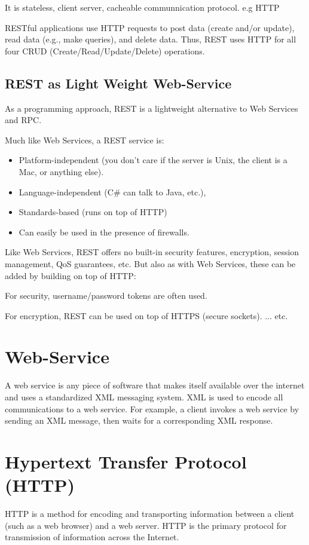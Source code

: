 \documentclass[letterpaper,10pt,english]{sphinxmanual}
\begin{document}
It is stateless, client server, cacheable communnication protocol. e.g HTTP

RESTful applications use HTTP requests to post data (create and/or update), read data (e.g., make queries), and delete data. Thus, REST uses HTTP for all four CRUD (Create/Read/Update/Delete) operations.


\subsection{REST as Light Weight Web-Service}
\label{week-10:rest-as-light-weight-web-service}
As a programming approach, REST is a lightweight alternative to Web Services and RPC.

Much like Web Services, a REST service is:
\begin{itemize}
\item {} 
Platform-independent (you don't care if the server is Unix, the client is a Mac, or anything else).

\item {} 
Language-independent (C\# can talk to Java, etc.),

\item {} 
Standards-based (runs on top of HTTP)

\item {} 
Can easily be used in the presence of firewalls.

\end{itemize}

Like Web Services, REST offers no built-in security features, encryption, session management, QoS guarantees, etc. But also as with Web Services, these can be added by building on top of HTTP:

For security, username/password tokens are often used.

For encryption, REST can be used on top of HTTPS (secure sockets).
... etc.


\section{Web-Service}
\label{week-10:web-service}
A web service is any piece of software that makes itself available over the internet and uses a standardized XML messaging system. XML is used to encode all communications to a web service. For example, a client invokes a web service by sending an XML message, then waits for a corresponding XML response.


\section{Hypertext Transfer Protocol (HTTP)}
\label{week-10:hypertext-transfer-protocol-http}
HTTP is a method for encoding and transporting information between a client (such as a web browser) and a web server. HTTP is the primary protocol for transmission of information across the Internet.
\end{document}
